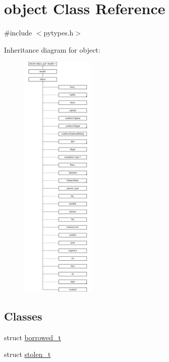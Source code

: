 \hypertarget{classobject}{}\section{object Class Reference}
\label{classobject}


{\ttfamily \#include $<$pytypes.\+h$>$}

Inheritance diagram for object\+:\begin{figure}[H]
\begin{center}
\leavevmode
\includegraphics[height=12.000000cm]{classobject}
\end{center}
\end{figure}
\subsection*{Classes}
\begin{DoxyCompactItemize}
\item 
struct \mbox{\hyperlink{structobject_1_1borrowed__t}{borrowed\+\_\+t}}
\item 
struct \mbox{\hyperlink{structobject_1_1stolen__t}{stolen\+\_\+t}}
\end{DoxyCompactItemize}
